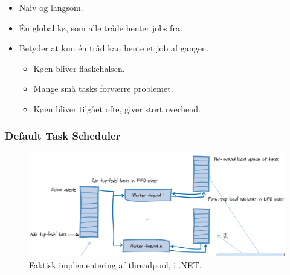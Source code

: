 \begin{itemize}
	\item Naiv og langsom.
	\item Én global kø, som alle tråde henter jobs fra.
	\item Betyder at kun én tråd kan hente et job af gangen.
	\begin{itemize}
		\item Køen bliver flaskehalsen.
		\item Mange små tasks forværre problemet.
		\item Køen bliver tilgået ofte, giver stort overhead.
	\end{itemize}
\end{itemize}

\subsubsection{Default Task Scheduler}

\begin{figure}[h]
	\centering
	\includegraphics[width=\linewidth]{figs/goodthreadpool}
	\caption{Faktisk implementering af threadpool, i .NET.}
	\label{fig:goodthreadpool}
\end{figure}


